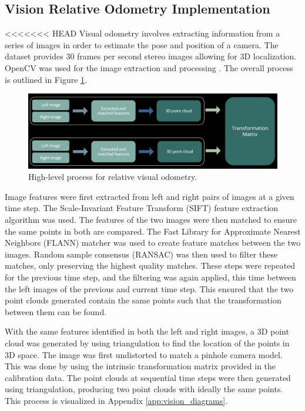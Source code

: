 \documentclass[bare_jrnl_transmag]{subfiles}
\begin{document}
\subsection{Vision Relative Odometry Implementation}

<<<<<<< HEAD
Visual odometry involves extracting information from a series of images in order to estimate the pose and position of a camera. The dataset provides 30 frames per second stereo images allowing for 3D localization. OpenCV was used for the image extraction and processing \cite{opencv}. The overall process is outlined in Figure \ref{fig:vio_process}.

\begin{figure}[H]
    \centering
    \includegraphics[width=1\linewidth]{figures/VIO_process.png}
    \caption{High-level process for relative visual odometry.}
    \label{fig:vio_process}
\end{figure}

Image features were first extracted from left and right pairs of images at a given time step. The Scale-Invariant Feature Transform (SIFT) feature extraction algorithm was used. The features of the two images were then matched to ensure the same points in both are compared. The Fast Library for Approximate Nearest Neighbors (FLANN) matcher was used to create feature matches between the two images.  Random sample consensus (RANSAC) was then used to filter these matches, only preserving the highest quality matches. These steps were repeated for the previous time step, and the filtering was again applied, this time between the left images of the previous and current time step. This ensured that the two point clouds generated contain the same points such that the transformation between them can be found. \newline

With the same features identified in both the left and right images, a 3D point cloud was generated by using triangulation to find the location of the points in 3D space. The image was first undistorted to match a pinhole camera model. This was done by using the intrinsic transformation matrix provided in the calibration data. The point clouds at sequential time steps were then generated using triangulation, producing two point clouds with ideally the same points. This process is visualized in Appendix \ref{app:vision_diagrams}. \newline
\end{document}
